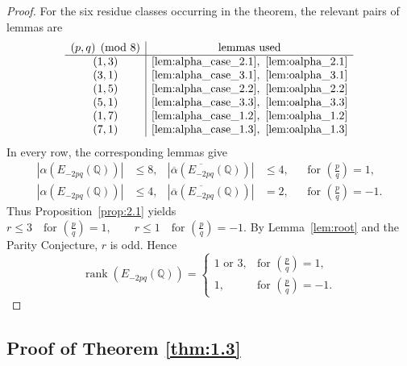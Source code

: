 \documentclass[12pt]{amsart}
\newcommand{\bbQ}{\mathbb{Q}}
\newcommand{\legendre}[2]{\genfrac{(}{)}{}{}{#1}{#2}}
\DeclareMathOperator{\rank}{rank}
\numberwithin{equation}{section}
\theoremstyle{definition}
\begin{document}
\begin{proof}
For the six residue classes occurring in the theorem, the relevant pairs of
lemmas are
\[
\begin{array}{c|c}
(p,q)\pmod8 & \text{lemmas used}\\
\hline
(1,3) & \ref{lem:alpha_case_2.1},\ \ref{lem:oalpha_2.1}\\
(3,1) & \ref{lem:alpha_case_3.1},\ \ref{lem:oalpha_3.1}\\
(1,5) & \ref{lem:alpha_case_2.2},\ \ref{lem:oalpha_2.2}\\
(5,1) & \ref{lem:alpha_case_3.3},\ \ref{lem:oalpha_3.3}\\
(1,7) & \ref{lem:alpha_case_1.2},\ \ref{lem:oalpha_1.2}\\
(7,1) & \ref{lem:alpha_case_1.3},\ \ref{lem:oalpha_1.3}
\end{array}
\]
In every row, the corresponding lemmas give
\[
\begin{aligned}
|\alpha(E_{-2pq}(\bbQ))|&\leq8,
&\left|\overline{\alpha}\left(\overline{E_{-2pq}}(\bbQ)\right)\right|&\leq4,
&&\text{for }\legendre{p}{q}=1,\\
|\alpha(E_{-2pq}(\bbQ))|&\leq4,
&\left|\overline{\alpha}\left(\overline{E_{-2pq}}(\bbQ)\right)\right|&=2,
&&\text{for }\legendre{p}{q}=-1.
\end{aligned}
\]
Thus Proposition~\ref{prop:2.1} yields
$\displaystyle
r\leq3 \quad\text{for }\legendre{p}{q}=1,
\qquad
r\leq1 \quad\text{for }\legendre{p}{q}=-1.
$
By Lemma~\ref{lem:root} and the Parity Conjecture, $r$ is odd. Hence
\[
\rank(E_{-2pq}(\bbQ))=
\begin{cases}
1\text{ or }3, & \text{for }\legendre{p}{q}=1,\\
1, & \text{for }\legendre{p}{q}=-1.
\end{cases}
\]
\end{proof}

\subsection*{Proof of Theorem \ref{thm:1.3}}
\end{document}
